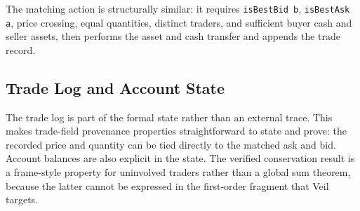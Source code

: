 The matching action is structurally similar: it requires \texttt{isBestBid b},
\texttt{isBestAsk a}, price crossing, equal quantities, distinct traders, and
sufficient buyer cash and seller assets, then performs the asset and cash
transfer and appends the trade record.

\subsection{Trade Log and Account State}

The trade log is part of the formal state rather than an external trace. This
makes trade-field provenance properties straightforward to state and prove: the
recorded price and quantity can be tied directly to the matched ask and bid.
Account balances are also explicit in the state. The verified conservation
result is a frame-style property for uninvolved traders rather than a global
sum theorem, because the latter cannot be expressed in the first-order fragment
that Veil targets.
